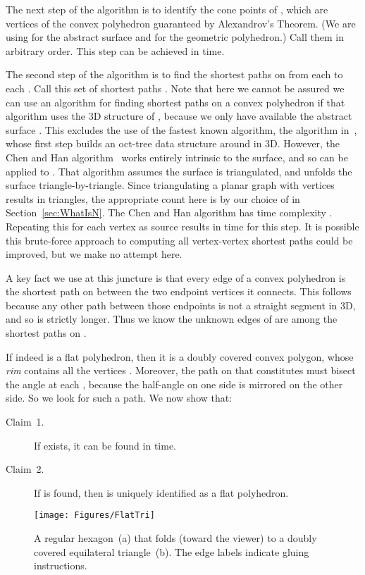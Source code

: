 \pdfoutput=1  \documentclass[]{article}
\newcommand{\figlab}[1]{\label{fig:#1}}
\newcommand{\secref}[1]{\ref{sec:#1}}
\begin{document}
The next step of the algorithm is to identify the  cone points
of , which are vertices of the convex polyhedron  guaranteed by
Alexandrov's Theorem.
(We are using  for the abstract surface and  for the geometric polyhedron.)
Call them  in arbitrary order.
This step can be achieved in  time.

The second step of the algorithm is to find the  shortest paths on 
from each  to each .  Call this set of shortest paths .
Note that here we cannot be assured we can use an algorithm for finding shortest paths
on a convex polyhedron  if that algorithm uses the 3D structure of
,
because we only have available the abstract surface .
This excludes the use of the fastest known algorithm,
the  algorithm in~\cite{ss-otasp-08}, whose first step
builds an oct-tree data structure around  in 3D.
However, the Chen and Han algorithm~\cite{ch-spp-96} works entirely
intrinsic to the surface, and so can be applied to .
That algorithm assumes the surface is triangulated, and unfolds
the surface triangle-by-triangle.
Since triangulating a planar graph with  vertices results in  triangles,
the appropriate count here is  by our choice of  in Section~\secref{WhatIsN}.
The Chen and Han algorithm has time complexity .
Repeating this for each vertex  as source results in 
time for this step.  It is possible this brute-force approach to
computing all vertex-vertex shortest paths could be improved, but
we make no attempt here.

A key fact we use at this juncture is that every edge of a convex
polyhedron 
is the shortest path on  between the two endpoint vertices it
connects.
This follows because any other path between those endpoints is not a
straight segment in 3D, and so is strictly longer.
Thus we know the unknown edges of  are among the  
shortest paths  on .

If indeed  is a flat polyhedron, then it is a doubly covered
convex polygon, whose \emph{rim}  contains all the vertices
.
Moreover, the path on  that constitutes  must bisect the
angle
at each , because the half-angle on one side is mirrored on the
other side.
So we look for such a path.
We now show that:
\begin{description}
\item[Claim~1.]
If  exists, it can be found in  time.
\item[Claim~2.]
If  is found, then  is uniquely identified 
as a flat polyhedron.
\end{description}

\begin{figure}[htbp]
\centering
\texttt{[image: Figures/FlatTri]}
\caption{A regular hexagon~(a) that folds 
(toward the viewer) to a doubly covered equilateral
  triangle~(b).
The edge labels indicate gluing instructions.}
\figlab{FlatTri}
\end{figure}
\end{document}
